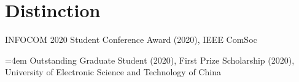 \vspace{-8pt}
\section*{Distinction}
\vspace{-4pt}
\indent

INFOCOM 2020 Student Conference Award (2020), IEEE ComSoc

\hangindent=4em Outstanding Graduate Student (2020), First Prize Scholarship (2020), University of Electronic Science and Technology of China
